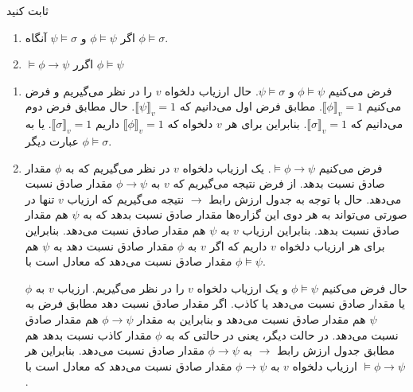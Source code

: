 ثابت کنید
\begin{enumerate}[label=(\alph*)]
\item
اگر
$\phi\models\psi$
و
$\psi\models\sigma$
آنگاه
$\phi\models\sigma$.

\item
$\models\phi\to\psi$
اگرر
$\phi\models\psi$
\end{enumerate}\quad
\begin{ans}
\begin{enumerate}[label=(\alph*)]
\item
فرض می‌کنیم $\phi\models\psi$
و
$\psi\models\sigma$.
حال ارزیاب دلخواه $v$ را در نظر می‌گیریم و فرض می‌کنیم $\llbracket\phi\rrbracket_v=1$. مطابق فرض اول می‌دانیم که
$\llbracket\psi\rrbracket_v=1$. حال مطابق فرض دوم می‌دانیم که
$\llbracket\sigma\rrbracket_v=1$.
بنابراین برای هر $v$ دلخواه که $\llbracket\phi\rrbracket_v=1$ داریم
$\llbracket\sigma\rrbracket_v=1$.
یا به عبارت دیگر
$\phi\models\sigma$.
\item
فرض می‌کنیم $\models\phi\to\psi$. یک ارزیاب دلخواه $v$ در نظر می‌گیریم که به $\phi$ مقدار صادق نسبت بدهد. از فرض نتیجه می‌گیریم که $v$ به $\phi\to\psi$ مقدار صادق نسبت می‌دهد. حال با توجه به جدول ارزش رابط $\to$ نتیجه می‌گیریم که ارزیاب $v$ تنها در صورتی می‌تواند به هر دوی این گزاره‌ها مقدار صادق نسبت بدهد که به $\psi$ هم مقدار صادق نسبت بدهد. بنابراین ارزیاب $v$ به $\psi$ هم مقدار صادق نسبت می‌دهد. بنابراین برای هر ارزیاب دلخواه $v$ داریم که اگر $v$ به $\phi$ مقدار صادق نسبت دهد به $\psi$ هم مقدار صادق نسبت می‌دهد که معادل است با $\phi\models\psi$.

حال فرض می‌کنیم
$\phi\models\psi$
و یک ارزیاب دلخواه $v$ را در نظر می‌گیریم. ارزیاب $v$ به $\phi$ یا مقدار صادق نسبت می‌دهد یا کاذب. اگر مقدار صادق نسبت دهد مطابق فرض به $\psi$ هم مقدار صادق نسبت می‌دهد و بنابراین به مقدار $\phi\to\psi$ هم مقدار صادق نسبت می‌دهد. در حالت دیگر، یعنی در حالتی که به $\phi$ مقدار کاذب نسبت بدهد هم مطابق جدول ارزش رابط $\to$ به $\phi\to\psi$ مقدار صادق نسبت می‌دهد. بنابراین هر ارزیاب دلخواه $v$ به $\phi\to\psi$ مقدار صادق نسبت می‌دهد که معادل است با $\models\phi\to\psi$.
\end{enumerate}
\end{ans}
